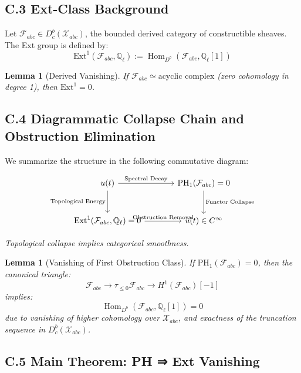 \documentclass[11pt]{article}
\newtheorem{lemma}[theorem]{Lemma}
\begin{document}
\subsection*{C.3 Ext-Class Background}

Let \( \mathcal{F}_{abc} \in D^b_c(\mathcal{X}_{abc}) \), the bounded derived category of constructible sheaves.  
The Ext group is defined by:
\[
\mathrm{Ext}^1(\mathcal{F}_{abc}, \mathbb{Q}_\ell) := \operatorname{Hom}_{D^b}(\mathcal{F}_{abc}, \mathbb{Q}_\ell[1])
\]

\begin{lemma}[Derived Vanishing]
If \( \mathcal{F}_{abc} \simeq \text{acyclic complex} \) (zero cohomology in degree 1), then \( \mathrm{Ext}^1 = 0 \).
\end{lemma}

\subsection*{C.4 Diagrammatic Collapse Chain and Obstruction Elimination}

We summarize the structure in the following commutative diagram:

\[
\begin{tikzcd}[row sep=large, column sep=large]
u(t) \arrow[r, "\text{Spectral Decay}"] \arrow[d, swap, "\text{Topological Energy}"]
& \mathrm{PH}_1(\mathcal{F}_{abc}) = 0 \arrow[d, "\text{Functor Collapse}"] \\
\mathrm{Ext}^1(\mathcal{F}_{abc}, \mathbb{Q}_\ell) = 0 \arrow[r, "\text{Obstruction Removal}"]
& u(t) \in C^\infty
\end{tikzcd}
\]

\begin{center}
    \textit{Topological collapse implies categorical smoothness.}
\end{center}

\begin{lemma}[Vanishing of First Obstruction Class]
If \( \mathrm{PH}_1(\mathcal{F}_{abc}) = 0 \), then the canonical triangle:
\[
\mathcal{F}_{abc} \to \tau_{\leq 0} \mathcal{F}_{abc} \to H^1(\mathcal{F}_{abc})[-1]
\]
implies:
\[
\operatorname{Hom}_{D^b}(\mathcal{F}_{abc}, \mathbb{Q}_\ell[1]) = 0
\]
due to vanishing of higher cohomology over \( \mathcal{X}_{abc} \),  
and exactness of the truncation sequence in \( D^b_c(\mathcal{X}_{abc}) \).
\end{lemma}


\subsection*{C.5 Main Theorem: PH ⇒ Ext Vanishing}
\end{document}
